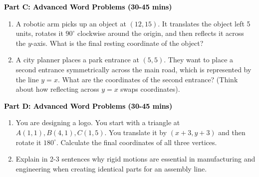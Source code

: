 \documentclass[12pt, letterpaper, fleqn]{article}
\begin{document}
\begin{tcolorbox}[colback=customteal!20]
\large\textcolor{black}{\textbf{Part C: Advanced Word Problems (30-45 mins)}}
\end{tcolorbox}

\vspace{3mm}

\begin{enumerate}[itemsep=5.5cm, leftmargin=0.6cm, resume]
\item A robotic arm picks up an object at $(12, 15)$. It translates the object left 5 units, rotates it $90^\circ$ clockwise around the origin, and then reflects it across the $y$-axis. What is the final resting coordinate of the object?
\item A city planner places a park entrance at $(5, 5)$. They want to place a second entrance symmetrically across the main road, which is represented by the line $y = x$. What are the coordinates of the second entrance? (Think about how reflecting across $y = x$ swaps coordinates).
\end{enumerate}

\newpage

\begin{tcolorbox}[colback=customteal!20]
\large\textcolor{black}{\textbf{Part D: Advanced Word Problems (30-45 mins)}}
\end{tcolorbox}

\vspace{3mm}

\begin{enumerate}[itemsep=5.5cm, leftmargin=0.6cm, resume]
\item You are designing a logo. You start with a triangle at $A(1,1), B(4,1), C(1,5)$. You translate it by $(x+3, y+3)$ and then rotate it $180^\circ$. Calculate the final coordinates of all three vertices.
\item Explain in 2-3 sentences why rigid motions are essential in manufacturing and engineering when creating identical parts for an assembly line.
\end{enumerate}
\end{document}
